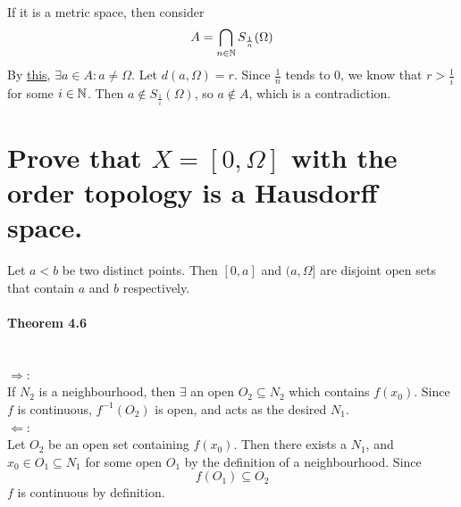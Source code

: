 \begin{parts}
\begin{solution}
 \\If it is a metric space, then consider
 $$A = \bigcap_{n \in \mathbb{N}} S_{\frac{1}{n}}(\Omega)$$
 By \hyperref[supp]{this}, $\exists a \in A: a \neq \Omega$. Let $d(a, \Omega) = r$. Since $\frac{1}{n}$ tends to 0, we know that $r > \frac{1}{i}$ for some $i \in \mathbb{N}$. Then $a \notin S_{\frac{1}{i}}(\Omega)$, so $a \notin A$, which is a contradiction.
\end{solution}

\part{Prove that $X = [0, \Omega]$ with the order topology is a Hausdorff space.}

\begin{solution}
 Let $a < b$ be two distinct points. Then $[0, a]$ and $(a, \Omega]$ are disjoint open sets that contain $a$ and $b$ respectively.
\end{solution}

\end{parts}

\subsection{Theorem 4.6}
\setcounter{question}{0}


\begin{solution}
 \\$\Rightarrow$: \\
 If $N_2$ is a neighbourhood, then $\exists$ an open $O_2 \subseteq N_2$ which contains $f(x_0)$. Since $f$ is continuous, $f^{-1}(O_2)$ is open, and acts as the desired $N_1$. \\
 $\Leftarrow$: \\
 Let $O_2$ be an open set containing $f(x_0)$. Then there exists a $N_1$, and $x_0 \in O_1 \subseteq N_1$ for some open $O_1$ by the definition of a neighbourhood. Since
 $$f(O_1) \subseteq O_2$$
 $f$ is continuous by definition.
\end{solution}

